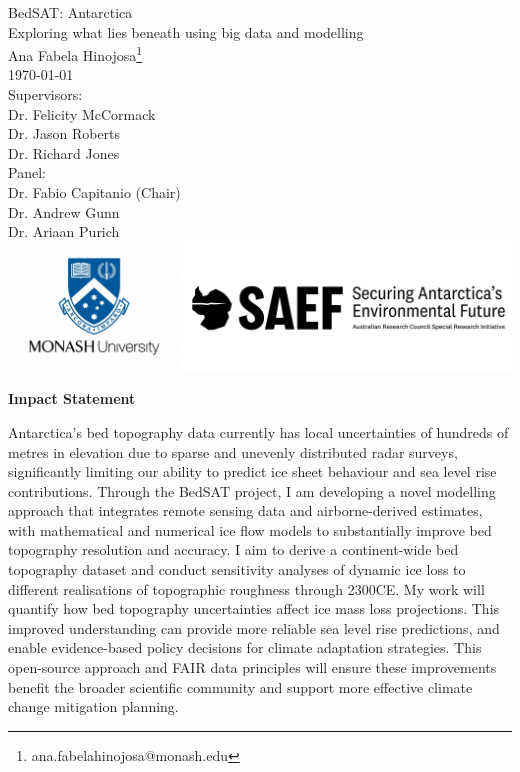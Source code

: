 \documentclass[12pt, a4paper, openany]{book}
\newenvironment{impactstatement}
{\clearpage \thispagestyle{empty} \null \vfill \begin{center} \bfseries \large Impact Statement \end{center}}
{\vfill \null \clearpage}
\begin{document}
\begin{titlepage}
\begin{center}
    {\Huge BedSAT: Antarctica}\\ [1cm] 
    {\Large Exploring what lies beneath using big data and modelling}\\
    \vspace{5cm}
    {\large Ana Fabela Hinojosa\footnote{ana.fabelahinojosa@monash.edu}}\\
    \monthyeardate\today\\ [1cm]
    Supervisors:\\
    Dr. Felicity McCormack\\
    Dr. Jason Roberts\\
    Dr. Richard Jones\\ [2cm]
    Panel:\\
    Dr. Fabio Capitanio (Chair) \\
    Dr. Andrew Gunn \\
    Dr. Ariaan Purich \\ [3.5cm]
    \includegraphics[scale=0.2]{logos.png}
    \end{center}
\end{titlepage}

\begin{impactstatement}\label{impactstatement}
Antarctica's bed topography data currently has local uncertainties of hundreds of metres in elevation due to sparse and unevenly distributed radar surveys, significantly limiting our ability to predict ice sheet behaviour and sea level rise contributions. Through the BedSAT project, I am developing a novel modelling approach that integrates remote sensing data and airborne-derived estimates, with mathematical and numerical ice flow models to substantially improve bed topography resolution and accuracy. I aim to derive a continent-wide bed topography dataset and conduct sensitivity analyses of dynamic ice loss to different realisations of topographic roughness through 2300CE.
My work will quantify how bed topography uncertainties affect ice mass loss projections. This improved understanding can provide more reliable sea level rise predictions, and enable evidence-based policy decisions for climate adaptation strategies. This open-source approach and FAIR data principles will ensure these improvements benefit the broader scientific community and support more effective climate change mitigation planning.
\end{impactstatement}
\end{document}
